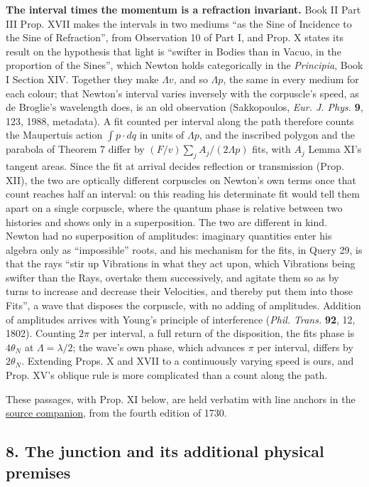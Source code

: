 \documentclass[11pt,a4paper]{article}
\begin{document}
\textbf{The interval times the momentum is a refraction invariant.} Book
II Part III Prop. XVII makes the intervals in two mediums ``as the Sine
of Incidence to the Sine of Refraction'', from Observation 10 of Part I,
and Prop. X states its result on the hypothesis that light is ``swifter
in Bodies than in Vacuo, in the proportion of the Sines'', which Newton
holds categorically in the \emph{Principia}, Book I Section XIV.
Together they make \(\Lambda v\), and so \(\Lambda p\), the same in
every medium for each colour; that Newton's interval varies inversely
with the corpuscle's speed, as de Broglie's wavelength does, is an old
observation (Sakkopoulos, \emph{Eur. J. Phys.} \textbf{9}, 123, 1988,
metadata). A fit counted per interval along the path therefore counts
the Maupertuis action \(\int p\cdot dq\) in units of \(\Lambda p\), and
the inscribed polygon and the parabola of Theorem 7 differ by
\((F/v)\sum_jA_j/(2\Lambda p)\) fits, with \(A_j\) Lemma XI's tangent
areas. Since the fit at arrival decides reflection or transmission
(Prop. XII), the two are optically different corpuscles on Newton's own
terms once that count reaches half an interval: on this reading his
determinate fit would tell them apart on a single corpuscle, where the
quantum phase is relative between two histories and shows only in a
superposition. The two are different in kind. Newton had no
superposition of amplitudes: imaginary quantities enter his algebra only
as ``impossible'' roots, and his mechanism for the fits, in Query 29, is
that the rays ``stir up Vibrations in what they act upon, which
Vibrations being swifter than the Rays, overtake them successively, and
agitate them so as by turns to increase and decrease their Velocities,
and thereby put them into those Fits'', a wave that disposes the
corpuscle, with no adding of amplitudes. Addition of amplitudes arrives
with Young's principle of interference (\emph{Phil. Trans.} \textbf{92},
12, 1802). Counting \(2\pi\) per interval, a full return of the
disposition, the fits phase is \(4\theta_N\) at \(\Lambda=\lambda/2\);
the wave's own phase, which advances \(\pi\) per interval, differs by
\(2\theta_N\). Extending Props. X and XVII to a continuously varying
speed is ours, and Prop. XV's oblique rule is more complicated than a
count along the path.

These passages, with Prop. XI below, are held verbatim with line anchors
in the
\href{../docs/classics/Newton_Opticks_1730_fits_and_queries.md}{source
companion}, from the fourth edition of 1730.

\hypertarget{the-junction-and-its-additional-physical-premises}{%
\subsection{8. The junction and its additional physical
premises}\label{the-junction-and-its-additional-physical-premises}}
\end{document}
